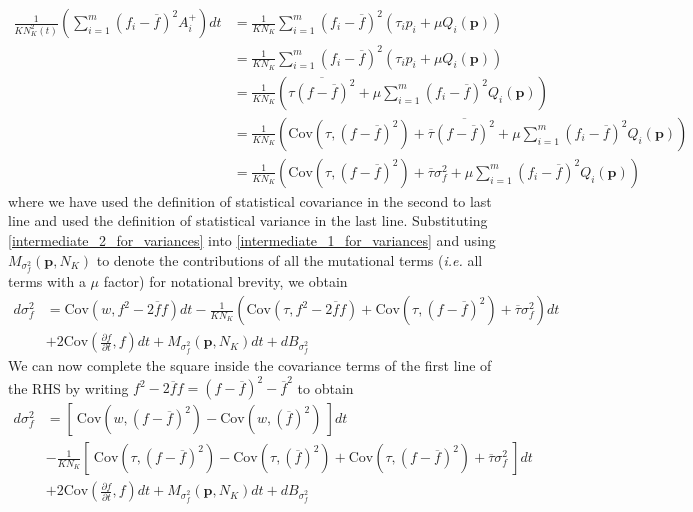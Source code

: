 \begin{align}
\frac{1}{KN^2_{K}(t)}\left(\sum\limits_{i=1}^{m}(f_i-\overline{f})^2A_i^+\right)dt &= \frac{1}{KN_{K}}\sum\limits_{i=1}^{m}(f_i-\overline{f})^2\left(\tau_ip_i + \mu Q_i(\mathbf{p})\right)\\
&= \frac{1}{KN_K}\sum\limits_{i=1}^{m}\left(f_i - \overline{f}\right)^2\left(\tau_ip_i + \mu Q_i(\mathbf{p})\right)\\
&= \frac{1}{KN_K}\left(\overline{\tau\left(f - \overline{f}\right)^2}+\mu \sum\limits_{i=1}^{m}\left(f_i - \overline{f}\right)^2Q_i(\mathbf{p})\right)\\
&= \frac{1}{KN_K}\left(\textrm{Cov}(\tau,\left(f - \overline{f}\right)^2) + \overline{\tau}\overline{\left(f - \overline{f}\right)^2} +\mu \sum\limits_{i=1}^{m}\left(f_i - \overline{f}\right)^2Q_i(\mathbf{p})\right)\\
&= \frac{1}{KN_K}\left(\textrm{Cov}(\tau,\left(f - \overline{f}\right)^2) + \overline{\tau}\sigma^2_{f} +\mu \sum\limits_{i=1}^{m}\left(f_i - \overline{f}\right)^2Q_i(\mathbf{p})\right)\label{intermediate_2_for_variances}
\end{align}
where we have used the definition of statistical covariance in the second to last line and used the definition of statistical variance in the last line. Substituting \eqref{intermediate_2_for_variances} into \eqref{intermediate_1_for_variances} and using $M_{\sigma^2_f}(\mathbf{p},N_K)$ to denote the contributions of all the mutational terms (\emph{i.e.} all terms with a $\mu$ factor) for notational brevity, we obtain
\begin{equation}
\begin{aligned}
d\sigma^2_{f} &= \textrm{Cov}(w,f^2 - 2\overline{f}f)dt - \frac{1}{KN_K}\left(\textrm{Cov}(\tau,f^2 - 2\overline{f}f) + \textrm{Cov}(\tau,\left(f - \overline{f}\right)^2) + \overline{\tau}\sigma^2_{f} \right)dt\\
&+ 2\textrm{Cov}\left(\frac{\partial f}{\partial t},f\right)dt + M_{\sigma^2_f}(\mathbf{p},N_K)dt + dB_{\sigma^2_{f}}
\end{aligned}
\end{equation}
We can now complete the square inside the covariance terms of the first line of the RHS by writing $f^2 - 2\overline{f}f = (f - \overline{f})^2 - \overline{f}^2$ to obtain
\begin{equation}
\label{intermediate_3_for_variances}
\begin{aligned}
d\sigma^2_{f} &= \left[ \ \textrm{Cov}\left(w,(f - \overline{f})^2\right)-\textrm{Cov}\left(w, {\left(\overline{f}\right)}^2\right) \ \right]dt\\[12pt]
&- \frac{1}{KN_K}\left[ \ \textrm{Cov}\left(\tau,(f - \overline{f})^2\right) - \textrm{Cov}\left(\tau, {\left(\overline{f}\right)}^2\right) + \textrm{Cov}(\tau,\left(f - \overline{f}\right)^2) + \overline{\tau}\sigma^2_{f} \ \right]dt\\[12pt]
& + 2\textrm{Cov}\left(\frac{\partial f}{\partial t},f\right)dt + M_{\sigma^2_f}(\mathbf{p},N_K)dt + dB_{\sigma^2_{f}}
\end{aligned}
\end{equation}
